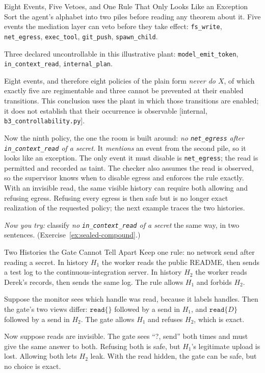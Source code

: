 \documentclass[11pt,a4paper]{article}
\theoremstyle{definition}
\begin{document}
\begin{pdexample}{Eight Events, Five Vetoes, and One Rule That Only Looks Like an Exception}
\setlength{\parskip}{4pt plus 1pt}
Sort the agent's alphabet into two piles before reading any theorem about it.
Five events the mediation layer can veto before they take effect:
\texttt{fs\_write}, \texttt{net\_egress}, \texttt{exec\_tool},
\texttt{git\_push}, \texttt{spawn\_child}.

Three declared uncontrollable in this illustrative plant:
\texttt{model\_emit\_token}, \texttt{in\_context\_read},
\texttt{internal\_plan}.

Eight events, and therefore eight policies of the
plain form \emph{never do $X$}, of which exactly five are regimentable and
three cannot be prevented at their enabled transitions. This conclusion
uses the plant in which those transitions are enabled; it does not establish
that their occurrence is observable [internal, \texttt{b3\_controllability.py}].

Now the ninth policy, the one the room is built around: \emph{no
\texttt{net\_egress} after \texttt{in\_context\_read} of a secret}. It
\emph{mentions} an event from the second pile, so it looks like an
exception. The only event it must disable is \texttt{net\_egress}; the read
is permitted and recorded as taint. The checker also assumes
the read is observed, so the supervisor knows when to disable egress and
enforces the rule exactly. With an invisible read, the same visible history
can require both allowing and refusing egress. Refusing every egress is then
safe but is no longer exact realization of the requested policy; the next
example traces the two histories.

\emph{Now you try:} classify \emph{no
\texttt{in\_context\_read} of a secret} the same way, in two sentences.
(Exercise~\ref{ex:sealed-compound}.)
\end{pdexample}

\begin{pdexample}{Two Histories the Gate Cannot Tell Apart}
\setlength{\parskip}{4pt plus 1pt}
Keep one rule: no network send after reading a secret. In history $H_1$ the
worker reads the public README, then sends a test log to the
continuous-integration server. In history $H_2$ the worker reads Derek's
records, then sends the same log. The rule allows $H_1$ and forbids $H_2$.

Suppose the monitor sees which handle was read, because it labels handles.
Then the gate's two views differ: $\mathtt{read}\{\}$ followed by a send in
$H_1$, and $\mathtt{read}\{D\}$ followed by a send in $H_2$. The gate allows
$H_1$ and refuses $H_2$, which is exact.

Now suppose reads are invisible. The gate sees ``?, send'' both times and must
give the same answer to both. Refusing both is safe, but $H_1$'s legitimate
upload is lost. Allowing both lets $H_2$ leak. With the read hidden, the gate
can be safe, but no choice is exact.
\end{pdexample}
\end{document}
